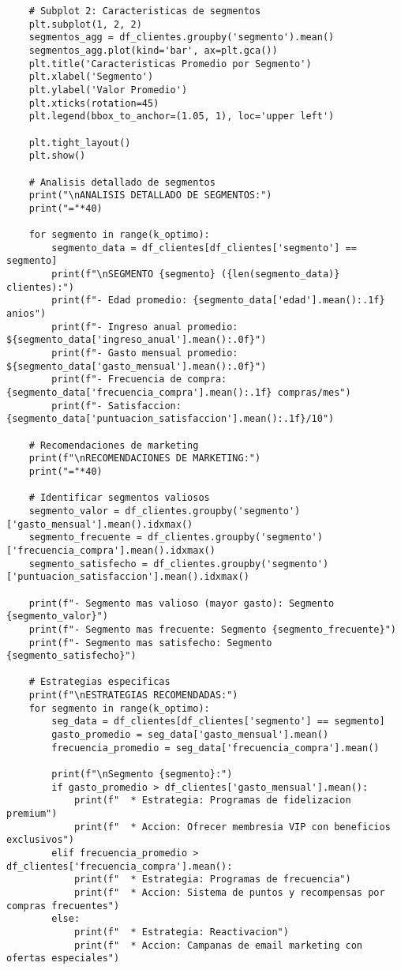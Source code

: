 \documentclass[12pt]{article}
\begin{document}
\begin{lstlisting}
    # Subplot 2: Caracteristicas de segmentos
    plt.subplot(1, 2, 2)
    segmentos_agg = df_clientes.groupby('segmento').mean()
    segmentos_agg.plot(kind='bar', ax=plt.gca())
    plt.title('Caracteristicas Promedio por Segmento')
    plt.xlabel('Segmento')
    plt.ylabel('Valor Promedio')
    plt.xticks(rotation=45)
    plt.legend(bbox_to_anchor=(1.05, 1), loc='upper left')
    
    plt.tight_layout()
    plt.show()
    
    # Analisis detallado de segmentos
    print("\nANALISIS DETALLADO DE SEGMENTOS:")
    print("="*40)
    
    for segmento in range(k_optimo):
        segmento_data = df_clientes[df_clientes['segmento'] == segmento]
        print(f"\nSEGMENTO {segmento} ({len(segmento_data)} clientes):")
        print(f"- Edad promedio: {segmento_data['edad'].mean():.1f} anios")
        print(f"- Ingreso anual promedio: ${segmento_data['ingreso_anual'].mean():.0f}")
        print(f"- Gasto mensual promedio: ${segmento_data['gasto_mensual'].mean():.0f}")
        print(f"- Frecuencia de compra: {segmento_data['frecuencia_compra'].mean():.1f} compras/mes")
        print(f"- Satisfaccion: {segmento_data['puntuacion_satisfaccion'].mean():.1f}/10")
    
    # Recomendaciones de marketing
    print(f"\nRECOMENDACIONES DE MARKETING:")
    print("="*40)
    
    # Identificar segmentos valiosos
    segmento_valor = df_clientes.groupby('segmento')['gasto_mensual'].mean().idxmax()
    segmento_frecuente = df_clientes.groupby('segmento')['frecuencia_compra'].mean().idxmax()
    segmento_satisfecho = df_clientes.groupby('segmento')['puntuacion_satisfaccion'].mean().idxmax()
    
    print(f"- Segmento mas valioso (mayor gasto): Segmento {segmento_valor}")
    print(f"- Segmento mas frecuente: Segmento {segmento_frecuente}")
    print(f"- Segmento mas satisfecho: Segmento {segmento_satisfecho}")
    
    # Estrategias especificas
    print(f"\nESTRATEGIAS RECOMENDADAS:")
    for segmento in range(k_optimo):
        seg_data = df_clientes[df_clientes['segmento'] == segmento]
        gasto_promedio = seg_data['gasto_mensual'].mean()
        frecuencia_promedio = seg_data['frecuencia_compra'].mean()
        
        print(f"\nSegmento {segmento}:")
        if gasto_promedio > df_clientes['gasto_mensual'].mean():
            print(f"  * Estrategia: Programas de fidelizacion premium")
            print(f"  * Accion: Ofrecer membresia VIP con beneficios exclusivos")
        elif frecuencia_promedio > df_clientes['frecuencia_compra'].mean():
            print(f"  * Estrategia: Programas de frecuencia")
            print(f"  * Accion: Sistema de puntos y recompensas por compras frecuentes")
        else:
            print(f"  * Estrategia: Reactivacion")
            print(f"  * Accion: Campanas de email marketing con ofertas especiales")
    

\end{lstlisting}
\end{document}
